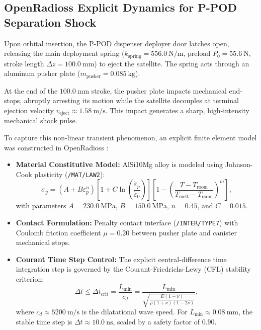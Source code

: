\subsection{OpenRadioss Explicit Dynamics for P-POD Separation Shock}

Upon orbital insertion, the P-POD dispenser deployer door latches open, releasing the main deployment spring ($k_{\text{spring}} = \SI{556.0}{\newton/\meter}$, preload $P_0 = \SI{55.6}{\newton}$, stroke length $\Delta z = \SI{100.0}{\milli\meter}$) to eject the satellite. The spring acts through an aluminum pusher plate ($m_{\text{pusher}} = \SI{0.085}{\kilo\gram}$). 

At the end of the $\SI{100.0}{\milli\meter}$ stroke, the pusher plate impacts mechanical end-stops, abruptly arresting its motion while the satellite decouples at terminal ejection velocity $v_{\text{eject}} \approx \SI{1.58}{\meter/\second}$. This impact generates a sharp, high-intensity mechanical shock pulse.

To capture this non-linear transient phenomenon, an explicit finite element model was constructed in OpenRadioss \cite{openradioss2023}:
\begin{itemize}
\item \textbf{Material Constitutive Model:} AlSi10Mg alloy is modeled using Johnson-Cook plasticity (\texttt{/MAT/LAW2}):
\begin{equation}
\sigma_y = \left( A + B \varepsilon_p^n \right) \left[ 1 + C \ln\left(\frac{\dot{\varepsilon}_p}{\dot{\varepsilon}_0}\right) \right] \left[ 1 - \left(\frac{T - T_{\text{room}}}{T_{\text{melt}} - T_{\text{room}}}\right)^m \right],
\label{eq:johnson_cook}
\end{equation}
with parameters $A = \SI{230.0}{\mega\pascal}$, $B = \SI{150.0}{\mega\pascal}$, $n = 0.45$, and $C = 0.015$.
\item \textbf{Contact Formulation:} Penalty contact interface (\texttt{/INTER/TYPE7}) with Coulomb friction coefficient $\mu = 0.20$ between pusher plate and canister mechanical stops.
\item \textbf{Courant Time Step Control:} The explicit central-difference time integration step is governed by the Courant-Friedrichs-Lewy (CFL) stability criterion:
\begin{equation}
\Delta t \le \Delta t_{\text{crit}} = \frac{L_{\min}}{c_d} = \frac{L_{\min}}{\sqrt{\frac{E(1-\nu)}{\rho(1+\nu)(1-2\nu)}}},
\label{eq:courant_crit}
\end{equation}
where $c_d \approx \SI{5200}{\meter/\second}$ is the dilatational wave speed. For $L_{\min} \approx \SI{0.08}{\milli\meter}$, the stable time step is $\Delta t \approx \SI{10.0}{\nano\second}$, scaled by a safety factor of $0.90$.
\end{itemize}

